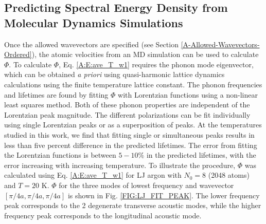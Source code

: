 \documentclass[aps,prb,preprint,superscriptaddress,amsmath,amssymb,floatfix]{revtex4}
\begin{document}
\subsection{\label{A-SED-MD}Predicting Spectral Energy Density from Molecular Dynamics Simulations}
Once the allowed wavevectors are specified (see Section \ref{A-Allowed-Wavevectors-Ordered}), the atomic velocities from an MD simulation can be used to calculate $\Phi$. To calculate $\Phi$, Eq$.$ \eqref{A:E:ave_T_w1} requires the phonon mode eigenvector, which can be obtained {\em a priori} using quasi-harmonic lattice dynamics calculations using the finite temperature lattice constant.\cite{mcgaughey2006b} The phonon frequencies and lifetimes are found by fitting $\Phi$ with Lorentzian functions using a non-linear least squares method. Both of these phonon properties are independent of the Lorentzian peak magnitude. The different polarizations can be fit individually using single Lorentzian peaks or as a superposition of peaks. At the temperatures studied in this work, we find that fitting single or simultaneous peaks results in less than five percent difference in the predicted lifetimes. The error from fitting the Lorentzian functions is between $5-10\%$ in the predicted lifetimes, with the error increasing with increasing temperature.\footnotemark
To illustrate the procedure, $\Phi$ was calculated using Eq$.$ \eqref{A:E:ave_T_w1} for LJ argon with $N_0=8$ (2048 atoms) and $T=20$ K. $\Phi$ for the three modes of lowest frequency and wavevector $[\pi/4a,\pi/4a,\pi/4a]$ is shown in Fig$.$ \ref{FIG:LJ_FIT_PEAK}. The lower frequency peak corresponds to the 2 degenerate transverse acoustic modes, while the higher frequency peak corresponds to the longitudinal acoustic mode.\cite{dove1993}
\end{document}
